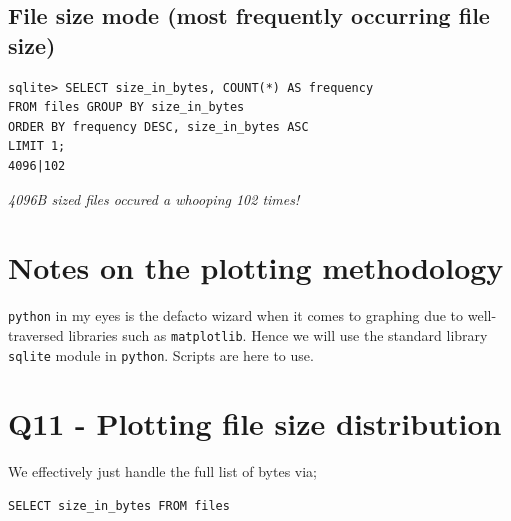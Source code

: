 \documentclass{article}
\begin{document}
\subsection*{File size mode (most frequently occurring file size)}
\begin{small}
\begin{verbatim}
sqlite> SELECT size_in_bytes, COUNT(*) AS frequency
FROM files GROUP BY size_in_bytes
ORDER BY frequency DESC, size_in_bytes ASC
LIMIT 1;
4096|102
\end{verbatim}
\end{small}
\textit{4096B sized files occured a whooping 102 times!}

\section*{Notes on the plotting methodology}
\texttt{python} in my eyes is the defacto wizard when it comes to graphing due to well-traversed libraries such as \texttt{matplotlib}. Hence we will use the standard library \texttt{sqlite} module in \texttt{python}. Scripts are here to use.

\section*{Q11 - Plotting file size distribution}
We effectively just handle the full list of bytes via;

\begin{small}
\begin{verbatim}
SELECT size_in_bytes FROM files
\end{verbatim}
\end{small}
\end{document}
